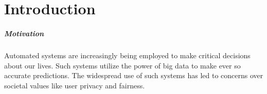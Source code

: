 \documentclass[10pt, onecolumn]{report}
\begin{document}
\chapter{Introduction}

\paragraph{Motivation}
Automated systems are increasingly being employed to make critical decisions 
about our lives. %
Such systems utilize the power of big data to make ever so accurate predictions.
The widespread use of such systems has led to concerns over societal values 
like user privacy and fairness. 
\end{document}
